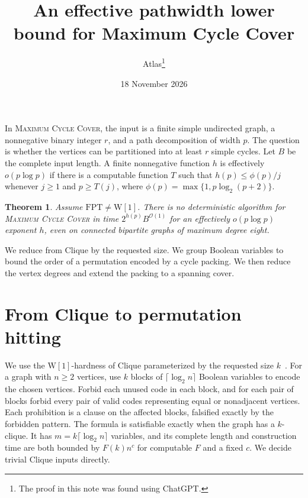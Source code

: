 \documentclass[11pt]{article}
\title{An effective pathwidth lower bound for Maximum Cycle Cover}
\author{Atlas\thanks{The proof in this note was found using ChatGPT.}}
\date{18 November 2026}
\newtheorem{theorem}{Theorem}
\begin{document}
\maketitle
In \textsc{Maximum Cycle Cover}, the input is a finite simple undirected
graph, a nonnegative binary integer $r$, and a path decomposition of
width $p$. The question is whether the vertices can be partitioned into
at least $r$ simple cycles. Let $B$ be the complete input length.
A finite nonnegative function $h$ is effectively $o(p\log p)$ if there
is a computable function $T$ such that $h(p)\le \phi(p)/j$
whenever $j\ge1$ and $p\ge T(j)$, where
$\phi(p)=\max\{1,p\log_2(p+2)\}$.

\hypertarget{maximum-cycle-cover-supplied-pathwidth-w1}{}
\begin{theorem}
Assume $\mathrm{FPT}\ne\mathrm{W}[1]$. There is no deterministic
algorithm for \textsc{Maximum Cycle Cover} in time
$2^{h(p)}B^{\mathcal O(1)}$ for an effectively $o(p\log p)$ exponent $h$,
even on connected bipartite graphs of maximum degree eight.
\end{theorem}

We reduce from Clique by the requested size. We group Boolean variables
to bound the order of a permutation encoded by a cycle packing. We then
reduce the vertex degrees and extend the packing to a spanning cover.


\section{From Clique to permutation hitting}

We use the \(\mathrm{W[1]}\)-hardness of Clique parameterized by the requested
size \(k\)~\cite{df}. For a graph with \(n\ge 2\) vertices, use \(k\) blocks of
\(\lceil\log_2 n\rceil\) Boolean variables to encode the chosen vertices.
Forbid each unused code in each block, and for each pair of blocks forbid every
pair of valid codes representing equal or nonadjacent vertices. Each prohibition
is a clause on the affected blocks, falsified exactly by the forbidden pattern.
The formula is satisfiable exactly when the graph has a \(k\)-clique. It has
\(m=k\lceil\log_2 n\rceil\) variables, and its complete length and construction
time are both bounded by \(F(k)n^c\) for computable \(F\) and a fixed \(c\).
We decide trivial Clique inputs directly.
\end{document}
